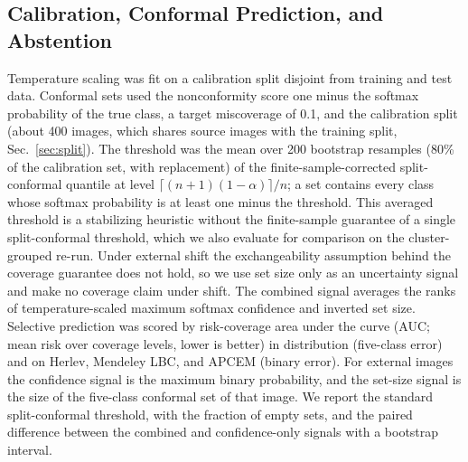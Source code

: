 \documentclass[12pt,letterpaper]{article}
\begin{document}
\subsection{Calibration, Conformal Prediction, and Abstention}
\label{sec:selective-methods}
Temperature scaling was fit on a calibration split disjoint from training and test data. Conformal sets used the nonconformity score one minus the softmax probability of the true class, a target miscoverage of 0.1, and the calibration split (about 400 images, which shares source images with the training split, Sec.~\ref{sec:split}). The threshold was the mean over 200 bootstrap resamples (80\% of the calibration set, with replacement) of the finite-sample-corrected split-conformal quantile at level $\lceil (n+1)(1-\alpha)\rceil/n$; a set contains every class whose softmax probability is at least one minus the threshold. This averaged threshold is a stabilizing heuristic without the finite-sample guarantee of a single split-conformal threshold, which we also evaluate for comparison on the cluster-grouped re-run. Under external shift the exchangeability assumption behind the coverage guarantee does not hold, so we use set size only as an uncertainty signal and make no coverage claim under shift. The combined signal averages the ranks of temperature-scaled maximum softmax confidence and inverted set size. Selective prediction was scored by risk-coverage area under the curve (AUC; mean risk over coverage levels, lower is better) in distribution (five-class error) and on Herlev, Mendeley LBC, and APCEM (binary error). For external images the confidence signal is the maximum binary probability, and the set-size signal is the size of the five-class conformal set of that image. We report the standard split-conformal threshold, with the fraction of empty sets, and the paired difference between the combined and confidence-only signals with a bootstrap interval.
\end{document}
